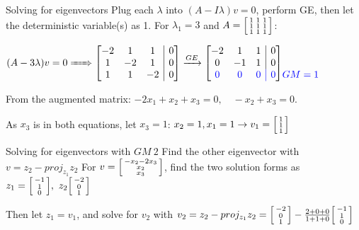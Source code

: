 \documentclass{article}
\makeatletter
\newenvironment{amatrix}[1]{%
  \left[\begin{array}{@{}*{#1}{c}|c@{}}
}{%
  \end{array}\right]
}
\makeatother
\begin{document}
\begin{knBox}[]{Solving for eigenvectors}
    Plug each $\lambda$ into $(A-I\lambda)v=0$, perform GE, then let the deterministic variable(s) as 1.
    \tcblower
    For $\lambda_1=3$ and $A=\begin{bsmallmatrix}
        1&1&1\\1&1&1\\1&1&1
    \end{bsmallmatrix}$:

    $(A-3\lambda)v=0 \xRightarrow{\hspace{0.5cm}} \begin{amatrix}{3}
        -2&1&1&0\\1&-2&1&0\\1&1&-2&0
    \end{amatrix}\xrightarrow{GE}\begin{amatrix}{3}
        -2&1&1&0\\0&-1&1&0\\\mathcolor{blue}{0&0&0&0}
    \end{amatrix}\begin{matrix}
        \ \\\ \\\mathcolor{blue}{GM=1}
    \end{matrix}$

    From the augmented matrix: $-2x_1+x_2+x_3=0,\quad -x_2+x_3=0$. 

    As $x_3$ is in both equations, let $x_3=1$: $x_2=1, x_1=1\rightarrow v_1=\begin{bsmallmatrix}
        1\\1\\1
    \end{bsmallmatrix}$
\end{knBox}
\begin{knBox}[]{Solving for eigenvectors with $GM\ 2$}
    Find the other eigenvector with $v = z_2 - proj_{z_1}z_2$
    \tcblower
    For $v=\begin{bsmallmatrix}
        -x_2-2x_3\\x_2\\x_3
    \end{bsmallmatrix}$, find the two solution forms as $z_1=\begin{bsmallmatrix}
        -1\\1\\0
    \end{bsmallmatrix},\ z_2\begin{bsmallmatrix}
        -2\\0\\1
    \end{bsmallmatrix}$

    Then let $z_1=v_1$, and solve for $v_2$ with $v_2=z_2-proj_{z_1}z_2=\begin{bsmallmatrix}
        -2\\0\\1
    \end{bsmallmatrix} - \frac{2+0+0}{1+1+0}\begin{bsmallmatrix}
        -1\\1\\0
    \end{bsmallmatrix}$
\end{knBox}
\end{document}

